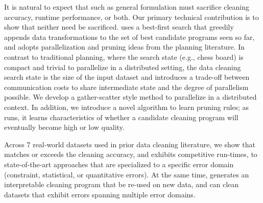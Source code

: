 It is natural to expect that such as general formulation must sacrifice cleaning accuracy, runtime performance, or both.  Our primary technical contribution is to show that neither need be sacrificed.  \sys uses a best-first search that greedily appends data transformations to the set of best candidate programs seen so far, and adopts parallelization and pruning ideas from the planning literature.  In contrast to traditional planning, where the search state (e.g., chess board) is compact and trivial to parallelize in a distributed setting, the data cleaning search state is the size of the input dataset and introduces a trade-off between communication costs to share intermediate state and the degree of parallelism possible.  We develop a gather-scatter style method to parallelize \sys in a distributed context.  In addition, we introduce a novel algorithm to learn pruning rules; as \sys runs, it learns characteristics of whether a candidate cleaning program will eventually become high or low quality.  

Across 7 real-world datasets used in prior data cleaning literature, we show that \sys matches or exceeds the cleaning accuracy, and exhibits competitive run-times, to state-of-the-art approaches that are specialized to a specific error domain (constraint, statistical, or quantitative errors).  At the same time, \sys generates an interpretable cleaning program that be re-used on new data, and can clean datasets that exhibit errors spanning multiple error domains. 




